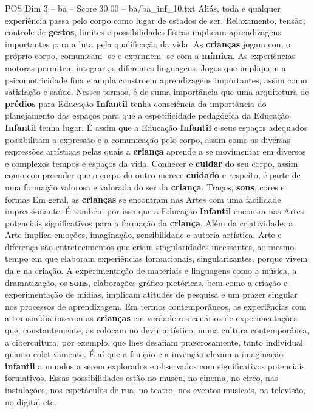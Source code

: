 \begin{textsample}{POS Dim 3 – ba – Score 30.00 – ba/ba\_inf\_10.txt}
Aliás, toda e qualquer experiência passa pelo corpo como lugar de estados de ser.
Relaxamento, tensão, controle de \textbf{gestos}, limites e possibilidades físicas implicam aprendizagens importantes para a luta pela qualificação da vida.
As \textbf{crianças} jogam com o próprio corpo, comunicam -se e exprimem -se com a \textbf{mímica}.
As experiências motoras permitem integrar as diferentes linguagens.
Jogos que impliquem a psicomotricidade fina e ampla constroem aprendizagens importantes, assim como satisfação e saúde.
Nesses termos, é de suma importância que uma arquitetura de \textbf{prédios} para Educação \textbf{Infantil} tenha consciência da importância do planejamento dos espaços para que a especificidade pedagógica da Educação \textbf{Infantil} tenha lugar.
É assim que a Educação \textbf{Infantil} e seus espaços adequados possibilitam a expressão e a comunicação pelo corpo, assim como as diversas expressões artísticas pelas quais a \textbf{criança} aprende a se movimentar em diversos e complexos tempos e espaços da vida.
Conhecer e \textbf{cuidar} do seu corpo, assim como compreender que o corpo do outro merece \textbf{cuidado} e respeito, é parte de uma formação valorosa e valorada do ser da \textbf{criança}.
Traços, \textbf{sons}, cores e formas Em geral, as \textbf{crianças} se encontram nas Artes com uma facilidade impressionante.
É também por isso que a Educação \textbf{Infantil} encontra nas Artes potenciais significativos para a formação da \textbf{criança}.
Além da criatividade, a Arte implica emoções, imaginação, sensibilidade e autoria artística.
Arte e diferença são entretecimentos que criam singularidades incessantes, ao mesmo tempo em que elaboram experiências formacionais, singularizantes, porque vivem da e na criação.
A experimentação de materiais e linguagens como a música, a dramatização, os \textbf{sons}, elaborações gráfico-pictóricas, bem como a criação e experimentação de mídias, implicam atitudes de pesquisa e um prazer singular nos processos de aprendizagem.
Em termos contemporâneos, as experiências com a transmídia inserem as \textbf{crianças} em verdadeiros cenários de experimentações que, constantemente, as colocam no devir artístico, numa cultura contemporânea, a cibercultura, por exemplo, que lhes desafiam prazerosamente, tanto individual quanto coletivamente.
É aí que a fruição e a invenção elevam a imaginação \textbf{infantil} a mundos a serem explorados e observados com significativos potenciais formativos.
Essas possibilidades estão no museu, no cinema, no circo, nas instalações, nos espetáculos de rua, no teatro, nos eventos musicais, na televisão, no digital etc.

\end{textsample}
